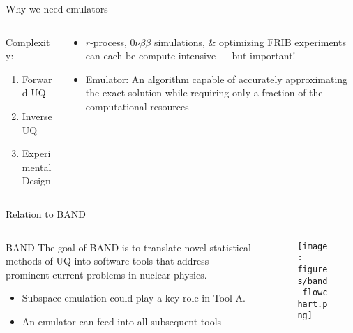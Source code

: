 \documentclass[xcolor=dvipsnames, aspectratio=169]{beamer}
\begin{document}
\begin{frame}{Why we need emulators}

\begin{columns}
\begin{column}{0.5\textwidth}
Complexity:
\begin{enumerate}
\item {} Forward UQ
\item {} Inverse UQ
\item {} Experimental Design
\end{enumerate}
\end{column}
\begin{column}{0.5\textwidth}
\begin{itemize}
    \item $r$-process, $0\nu\beta\beta$ simulations, \& optimizing FRIB experiments can each be compute intensive --- but important!
    \item Emulator: An algorithm capable of accurately approximating the exact solution while requiring only a fraction of the computational resources
\end{itemize}
\end{column}

\end{columns}
 
\end{frame}


\begin{frame}[t]{Relation to BAND}

\begin{columns}
\begin{column}{0.4\textwidth}
\begin{myblock}[valign=center]{BAND}
The goal of BAND is to translate novel statistical methods of UQ into
software tools that address prominent current problems in nuclear physics.
\end{myblock}
\begin{itemize}
\item Subspace emulation could play a key role in \alert{Tool A}.
\item An emulator can feed into all subsequent tools
\end{itemize}
\end{column}
\begin{column}{0.6\textwidth}
\begin{figure}
\texttt{[image: figures/band\_flowchart.png]}
\end{figure}
\end{column}
\end{columns}
\end{frame}
\end{document}

